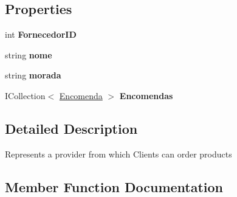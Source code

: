 \subsection*{Properties}
\begin{DoxyCompactItemize}
\item 
\mbox{\label{classmvc_j_j_m_s_1_1_models_1_1_fornecedor_a2a58cfd29948857208d37d5b40b864a4}} 
int {\bfseries Fornecedor\+ID}
\item 
\mbox{\label{classmvc_j_j_m_s_1_1_models_1_1_fornecedor_a5455734cda3c1e95a1a758c26020bbfe}} 
string {\bfseries nome}
\item 
\mbox{\label{classmvc_j_j_m_s_1_1_models_1_1_fornecedor_a05208e05a32384b3d6b29f9c2172047d}} 
string {\bfseries morada}
\item 
\mbox{\label{classmvc_j_j_m_s_1_1_models_1_1_fornecedor_a7dd659939d00a56e77608c477eff18e9}} 
I\+Collection$<$ \mbox{\hyperlink{classmvc_j_j_m_s_1_1_models_1_1_encomenda}{Encomenda}} $>$ {\bfseries Encomendas}
\end{DoxyCompactItemize}


\subsection{Detailed Description}
Represents a provider from which Clients can order products 



\subsection{Member Function Documentation}
\mbox{\label{classmvc_j_j_m_s_1_1_models_1_1_fornecedor_adbbebab32a2d6ba5cb4f14c3089b9373}} 
